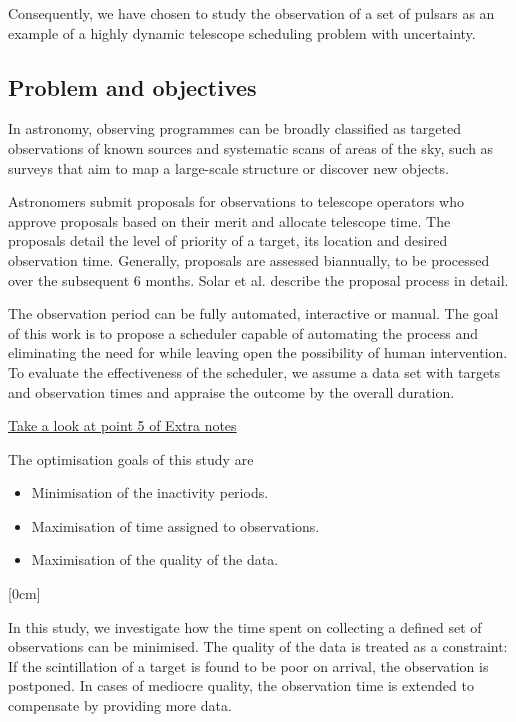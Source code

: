 \documentclass{article}
\begin{document}
Consequently, we have chosen to study the observation of a set of pulsars as an
example of a highly dynamic telescope scheduling problem with uncertainty.

\subsection*{Problem and objectives}
In astronomy, observing programmes can be broadly classified as targeted observations of known sources and systematic scans of areas of the sky, such as surveys that
aim to map a large-scale structure or discover new objects.

Astronomers submit proposals for observations to telescope operators who
approve proposals based on their merit and allocate telescope time. The proposals
detail the level of priority of a target, its location and desired observation time. Generally, proposals are assessed biannually, to be processed over the subsequent 6 months.
Solar et al. \cite{solar2016scheduling} describe the proposal process in detail.

The observation period can be fully automated, interactive or manual. The goal of
this work is to propose a scheduler capable of automating the process and eliminating
the need for while leaving open the possibility of human intervention. To evaluate the 
effectiveness of the scheduler, we assume a data set with targets and observation
times and appraise the outcome by the overall duration.

\hyperref[point:objectiveFunctions]{Take a look at point 5 of Extra notes}

The optimisation goals of this study are
\begin{itemize}
    \item Minimisation of the inactivity periods.
    \item Maximisation of time assigned to observations.
    \item Maximisation of the quality of the data.
\end{itemize}

[0cm]

In this study, we investigate how the time spent on collecting a defined set of
observations can be minimised. The quality of the data is treated as a constraint: If
the scintillation of a target is found to be poor on arrival, the observation is postponed. In cases of mediocre quality, the observation time is extended to compensate
by providing more data.
\end{document}
